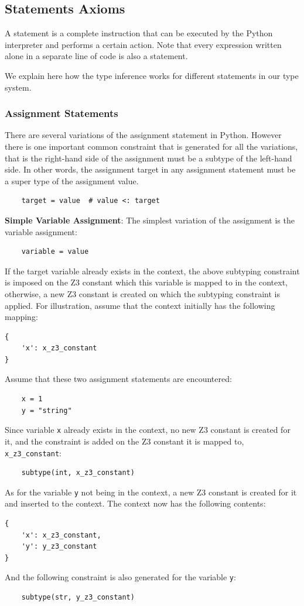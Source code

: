 \subsection{Statements Axioms}
A statement is a complete instruction that can be executed by the Python interpreter and performs a certain action. Note that every expression written alone in a separate line of code is also a statement.

We explain here how the type inference works for different statements in our type system.

\subsubsection{Assignment Statements}
There are several variations of the assignment statement in Python. However there is one important common constraint that is generated for all the variations, that is the right-hand side of the assignment must be a subtype of the left-hand side. In other words, the assignment target in any assignment statement must be a super type of the assignment value.

\begin{lstlisting}
	target = value  # value <: target
\end{lstlisting}


\textbf{Simple Variable Assignment}: The simplest variation of the assignment is the variable assignment:
\begin{lstlisting}
	variable = value
\end{lstlisting}
If the target variable already exists in the context, the above subtyping constraint is imposed on the Z3 constant which this variable is mapped to in the context, otherwise, a new Z3 constant is created on which the subtyping constraint is applied. For illustration, assume that the context initially has the following mapping:
\begin{lstlisting}
{
	'x': x_z3_constant
}
\end{lstlisting}
Assume that these two assignment statements are encountered:
\begin{lstlisting}
	x = 1
	y = "string"
\end{lstlisting}
Since variable \lstinline|x| already exists in the context, no new Z3 constant is created for it, and the constraint is added on the Z3 constant it is mapped to, \lstinline|x_z3_constant|:
\begin{lstlisting}
	subtype(int, x_z3_constant)
\end{lstlisting}
As for the variable \lstinline|y| not being in the context, a new Z3 constant is created for it and inserted to the context. The context now has the following contents:
\begin{lstlisting}
{
	'x': x_z3_constant,
	'y': y_z3_constant
}
\end{lstlisting}
And the following constraint is also generated for the variable \lstinline|y|:
\begin{lstlisting}
	subtype(str, y_z3_constant)
\end{lstlisting}

